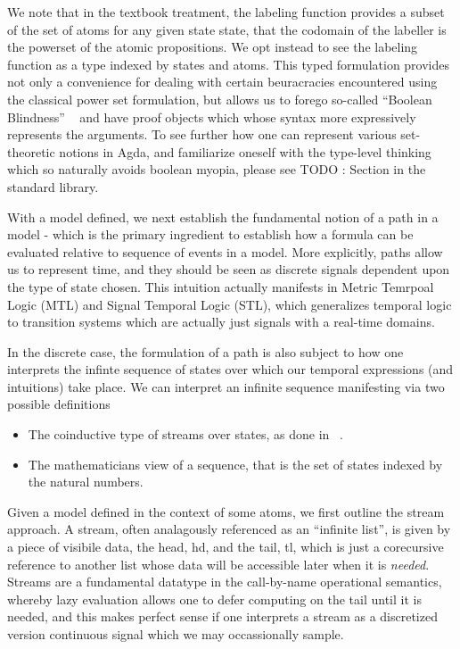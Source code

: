 \documentclass[a4paper, 11pt]{article}
\newcommand{\pink}[1]{\textcolor{hotmagenta}{#1}}
\begin{document}
We note that in the textbook treatment, the labeling function provides a subset
of the set of atoms for any given state state, that the codomain of the labeller
is the powerset of the atomic propositions. We opt instead to see the labeling
function as a type indexed by states and atoms. This typed formulation provides
not only a convenience for dealing with certain beuracracies encountered using
the classical power set formulation, but allows us to forego so-called ``Boolean
Blindness'' ~\cite{harperBlindness} and have proof objects which whose syntax
more expressively represents the arguments. To see further how one can represent
various set-theoretic notions in Agda, and familiarize oneself with the
type-level thinking which so naturally avoids boolean myopia, please see TODO :
Section in the standard library.

With a model defined, we next establish the fundamental notion of a path in a
model - which is the primary ingredient to establish how a formula can be
evaluated relative to sequence of events in a model. More explicitly, paths
allow us to represent time, and they should be seen as discrete signals
dependent upon the type of state chosen. This intuition actually manifests in
Metric Temrpoal Logic (MTL) and Signal Temporal Logic (STL), which generalizes
temporal logic to transition systems which are actually just signals with a
real-time domains.

In the discrete case, the formulation of a path is also subject to how one
interprets the infinte sequence of states over which our temporal expressions
(and intuitions) take place. We can interpret an infinite sequence manifesting
via two possible definitions

\begin{itemize}
\item The coinductive type of streams over states, as done in ~\cite{coqLTL}.
\item The mathematicians view of a sequence, that is the set of states indexed
by the natural numbers.
\end{itemize}

Given a model defined in the context of some atoms, we first outline the stream
approach. A stream, often analagously referenced as an ``infinite list'', is
given by a piece of visibile data, the head, \pink{hd}, and the tail, \pink{tl},
which is just a corecursive reference to another list whose data will be
accessible later when it is \emph{needed}. Streams are a fundamental datatype
in the call-by-name operational semantics, whereby lazy evaluation allows one to
defer computing on the tail until it is needed, and this makes perfect sense if
one interprets a stream as a discretized version continuous signal which we may
occassionally sample.
\end{document}

